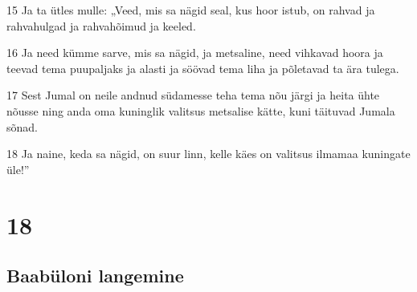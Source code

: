\par 15 Ja ta ütles mulle: „Veed, mis sa nägid seal, kus hoor istub, on rahvad ja rahvahulgad ja rahvahõimud ja keeled.
\par 16 Ja need kümme sarve, mis sa nägid, ja metsaline, need vihkavad hoora ja teevad tema puupaljaks ja alasti ja söövad tema liha ja põletavad ta ära tulega.
\par 17 Sest Jumal on neile andnud südamesse teha tema nõu järgi ja heita ühte nõusse ning anda oma kuninglik valitsus metsalise kätte, kuni täituvad Jumala sõnad.
\par 18 Ja naine, keda sa nägid, on suur linn, kelle käes on valitsus ilmamaa kuningate üle!”


\chapter{18}

\section*{Baabüloni langemine}

